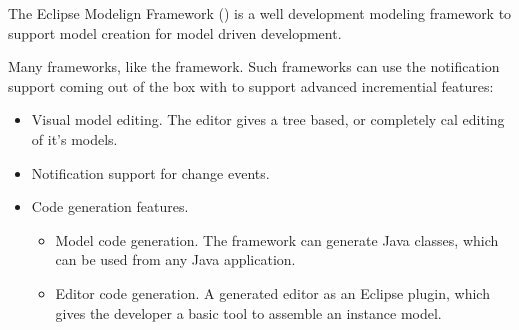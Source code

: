 The Eclipse Modelign Framework (\emf) is a well development modeling framework to support model creation for model driven development.

Many frameworks, like the \viatra{} framework. Such frameworks can use the notification support coming out of the box with \emf{} to support advanced incremential features:
\begin{itemize}
	\item Visual model editing. The \emf{} editor gives a tree based, or completely cal editing of it's models.
	\item Notification support for change events.
	\item Code generation features.
	      \begin{itemize}
	      	\item Model code generation. The framework can generate Java classes, which can be used from any Java application.
	      	\item Editor code generation. A generated editor as an Eclipse plugin, which gives the developer a basic tool to assemble an instance model.
	      \end{itemize}
\end{itemize}
